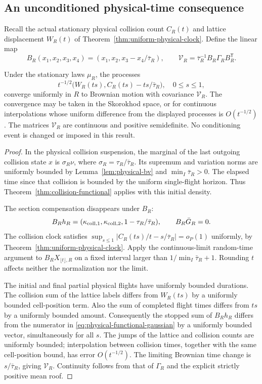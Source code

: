 \subsection{An unconditioned physical-time consequence}
Recall the actual stationary physical collision count $C_R(t)$ and
lattice displacement $W_R(t)$ of
Theorem~\ref{thm:uniform-physical-clock}. Define the linear map
\[
 B_R(x_1,x_2,x_3,x_4)=(x_1,x_2,x_3-x_4/\bar\tau_R),\qquad
 \mathcal V_R=\bar\tau_R^{-1}B_R\Gamma_R B_R^{\mathsf T}.
\]
\begin{corollary}
\label{cor:physical-functional-gaussian}
Under the stationary laws $\mu_R$, the processes
\begin{equation}\label{eq:physical-functional-gaussian}
 t^{-1/2}\bigl(W_R(ts),C_R(ts)-ts/\bar\tau_R\bigr),\quad 0\le s\le1,
\end{equation}
converge uniformly in $R$ to Brownian motion with covariance $\mathcal V_R$.
The convergence may be taken in the Skorokhod space, or for continuous
interpolations whose uniform difference from the displayed processes
is $O(t^{-1/2})$. The matrices $\mathcal V_R$ are continuous and positive
semidefinite. No conditioning event is changed or imposed in this result.
\end{corollary}
\begin{proof}
In the physical collision suspension, the marginal of the last outgoing
collision state $x$ is $\sigma_R\nu$, where
$\sigma_R=\tau_R/\bar\tau_R$. Its supremum and variation norms are
uniformly bounded by Lemma~\ref{lem:physical-bv} and
$\min_I\bar\tau_R>0$. The elapsed time since that collision is bounded
by the uniform single-flight horizon. Thus
Theorem~\ref{thm:collision-functional} applies with this initial density.

The section compensation disappears under $B_R$:
\[
 B_Rh_R=(\kappa_{{\rm coll},1},\kappa_{{\rm coll},2},
                    1-\tau_R/\bar\tau_R),
 \qquad B_R\bar G_R=0.
\]
The collision clock satisfies
$\sup_{s\le1}|C_R(ts)/t-s/\bar\tau_R|=o_P(1)$ uniformly, by
Theorem~\ref{thm:uniform-physical-clock}. Apply the continuous-limit
random-time argument to $B_RX_{\lfloor t\rfloor,R}$ on a fixed interval
larger than $1/\min_I\bar\tau_R+1$. Rounding $t$ affects neither the
normalization nor the limit.

The initial and final partial physical flights have uniformly bounded
durations. The collision sum of the lattice labels differs from
$W_R(ts)$ by a uniformly bounded cell-position term. Also the sum of
completed flight times differs from $ts$ by a uniformly bounded amount.
Consequently the stopped sum of $B_Rh_R$ differs from the numerator in
\eqref{eq:physical-functional-gaussian} by a uniformly bounded vector,
simultaneously for all $s$. The jumps of the lattice and collision counts
are uniformly bounded; interpolation between collision times, together
with the same cell-position bound, has error $O(t^{-1/2})$. The limiting
Brownian time change is $s/\bar\tau_R$, giving $\mathcal V_R$. Continuity follows
from that of $\Gamma_R$ and the explicit strictly positive mean roof.
\end{proof}


